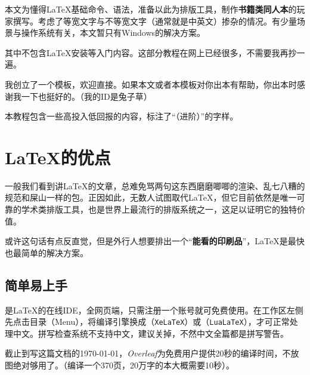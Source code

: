 \documentclass[10pt,openany]{book}
\begin{document}

\pagestyle{mystyle}

\startcontents[tutorial]

\mytitlepage

\null\vfill

本文为懂得{\LaTeX}基础命令、语法，准备以此为排版工具，制作\textbf{书籍类同人本}的玩家撰写。考虑了等宽文字与不等宽文字（通常就是中英文）掺杂的情况。有少量场景与操作系统有关，本文暂只有Windows的解决方案。

其中不包含{\LaTeX}安装等入门内容。这部分教程在网上已经很多，不需要我再抄一遍。

我创立了一个模板，欢迎直接。如果本文或者本模板对你出本有帮助，你出本时感谢我一下也挺好的。（我的ID是兔子草）

本教程包含一些高投入低回报的内容，标注了“（进阶）”的字样。

\vfill\vfill

\tableofcontents

\cleardoublepage

\setcounter{page}{1}

\chapter{{\LaTeX}的优点}

一般我们看到讲{\LaTeX}的文章，总难免骂两句这东西磨磨唧唧的渲染、乱七八糟的规范和屎山一样的包。正因如此，无数人试图取代{\LaTeX}，但它目前依然是唯一可靠的学术类排版工具，也是世界上最流行的排版系统之一，这足以证明它的独特价值。

或许这句话有点反直觉，但是外行人想要排出一个“\textbf{能看的印刷品}”，{\LaTeX}是最快也最简单的解决方案。

\section{简单易上手}

是{\LaTeX}的在线IDE，全网页端，只需注册一个账号就可免费使用。在工作区左侧先点击目录（Menu），将编译引擎换成{\XeLaTeX}（\texttt{XeLaTeX}）或{\LuaLaTeX}（\texttt{LuaLaTeX}），才可正常处理中文。拼写检查系统不支持中文，建议关掉，不然中文全篇都是拼写警告。

截止到写这篇文档的\today，\textit{Overleaf}为免费用户提供20秒的编译时间，不放图绝对够用了。（编译一个370页，20万字的本大概需要10秒）。
\end{document}
